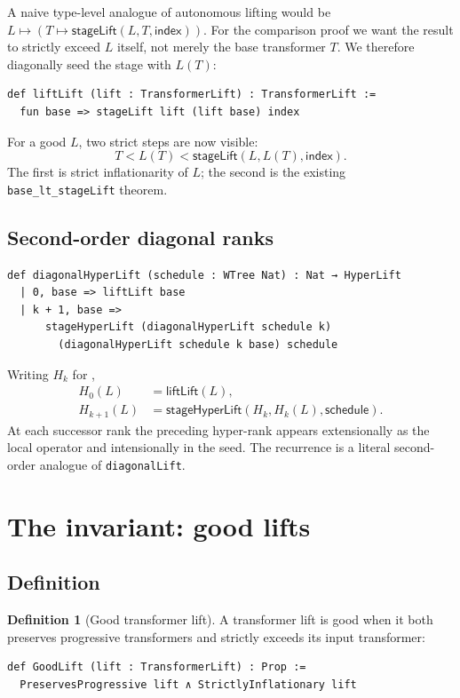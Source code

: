 \documentclass[11pt]{article}
\theoremstyle{definition}
\newtheorem{definition}[theorem]{Definition}
\theoremstyle{remark}
\newcommand{\lean}[1]{\nolinkurl{#1}}
\newcommand{\leancode}[1]{\texttt{\detokenize{#1}}}
\begin{document}
A naive type-level analogue of autonomous lifting would be
$L\mapsto(T\mapsto\mathsf{stageLift}(L,T,\mathsf{index}))$. For the comparison
proof we want the result to strictly exceed $L$ itself, not merely the base
transformer $T$. We therefore diagonally seed the stage with $L(T)$:

\begin{lstlisting}
def liftLift (lift : TransformerLift) : TransformerLift :=
  fun base => stageLift lift (lift base) index
\end{lstlisting}

For a good $L$, two strict steps are now visible:
\[
  T < L(T) < \mathsf{stageLift}(L,L(T),\mathsf{index}).
\]
The first is strict inflationarity of $L$; the second is the existing
\lean{base_lt_stageLift} theorem.

\subsection{Second-order diagonal ranks}

\begin{lstlisting}
def diagonalHyperLift (schedule : WTree Nat) : Nat → HyperLift
  | 0, base => liftLift base
  | k + 1, base =>
      stageHyperLift (diagonalHyperLift schedule k)
        (diagonalHyperLift schedule k base) schedule
\end{lstlisting}

Writing $H_k$ for \leancode{diagonalHyperLift schedule k},
\begin{align*}
H_0(L) &= \mathsf{liftLift}(L),\\
H_{k+1}(L) &= \mathsf{stageHyperLift}(H_k,H_k(L),\mathsf{schedule}).
\end{align*}
At each successor rank the preceding hyper-rank appears extensionally as the
local operator and intensionally in the seed. The recurrence is a literal
second-order analogue of \lean{diagonalLift}.

\section{The invariant: good lifts}

\subsection{Definition}

\begin{definition}[Good transformer lift]
A transformer lift is good when it both preserves progressive transformers and
strictly exceeds its input transformer:
\begin{lstlisting}
def GoodLift (lift : TransformerLift) : Prop :=
  PreservesProgressive lift ∧ StrictlyInflationary lift
\end{lstlisting}
\end{definition}
\end{document}
